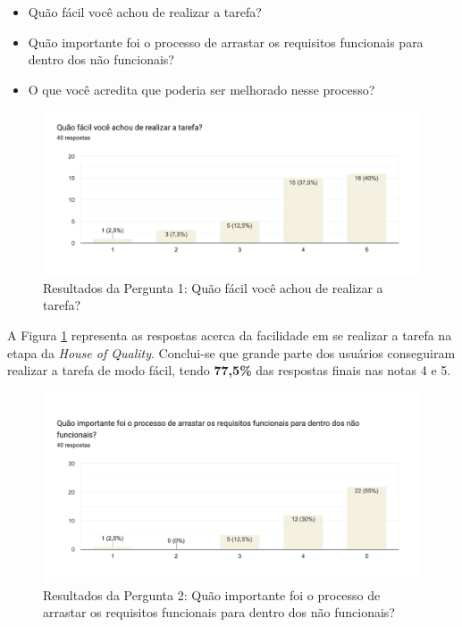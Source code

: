 \begin{itemize}
    \item Quão fácil você achou de realizar a tarefa?
    \item Quão importante foi o processo de arrastar os requisitos funcionais para dentro dos não funcionais?
    \item O que você acredita que poderia ser melhorado nesse processo?
\end{itemize}


\begin{figure}[]
  \begin{center}
      \caption{{Resultados da Pergunta 1: Quão fácil você achou de realizar a tarefa?}}
      \label{fig:hq_respostas_1}
      \includegraphics[scale=0.65]{figuras/questionario/resultados-hq-1.png}
  \end{center}
\end{figure}

A Figura \ref{fig:hq_respostas_1} representa as respostas acerca da facilidade em se realizar a tarefa na etapa da \textit{House of Quality}. Conclui-se que grande parte dos usuários conseguiram realizar a tarefa de modo fácil, tendo \textbf{77,5\%} das respostas finais nas notas 4 e 5.

\begin{figure}[]
  \begin{center}
      \caption{{Resultados da Pergunta 2: Quão importante foi o processo de arrastar os requisitos funcionais para dentro dos não funcionais?}}
      \label{fig:hq_respostas_2}
      \includegraphics[scale=0.65]{figuras/questionario/resultados-hq-2.png}
  \end{center}
\end{figure}

